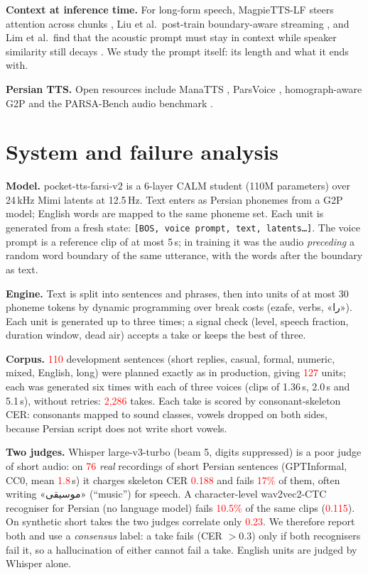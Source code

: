 \documentclass[conference]{IEEEtran}
\newcommand{\fa}[1]{{\persianfont\beginR #1\endR}}
\newcommand{\RES}[1]{\textcolor{red}{#1}}
\begin{document}
\textbf{Context at inference time.} For long-form speech, MagpieTTS-LF steers attention across chunks
\cite{magpielf2026}, Liu et al.\ post-train boundary-aware streaming \cite{liu2026boundary}, and Lim et al.\
find that the acoustic prompt must stay in context while speaker similarity still decays
\cite{lim2026longer}. We study the prompt itself: its length and what it ends with.

\textbf{Persian TTS.} Open resources include ManaTTS \cite{manatts2025}, ParsVoice \cite{parsvoice2026},
homograph-aware G2P \cite{homorich2025} and the PARSA-Bench audio benchmark \cite{parsabench2026}.

\section{System and failure analysis}\label{sec:system}
\textbf{Model.} pocket-tts-farsi-v2 \cite{farsiv2} is a 6-layer CALM student (110M parameters) over 24\,kHz
Mimi latents at 12.5\,Hz. Text enters as Persian phonemes from a G2P model; English words are mapped to the
same phoneme set. Each unit is generated from a fresh state: \texttt{[BOS, voice prompt, text, latents\dots]}.
The voice prompt is a reference clip of at most 5\,s; in training it was the audio \emph{preceding} a random
word boundary of the same utterance, with the words after the boundary as text.

\textbf{Engine.} Text is split into sentences and phrases, then into units of at most 30 phoneme tokens by
dynamic programming over break costs (ezafe, verbs, \fa{«را»}). Each unit is generated up to three times; a
signal check (level, speech fraction, duration window, dead air) accepts a take or keeps the best of three.

\textbf{Corpus.} \RES{110} development sentences (short replies, casual, formal, numeric, mixed, English, long)
were planned exactly as in production, giving \RES{127} units; each was generated six times with each of three voices
(clips of 1.36\,s, 2.0\,s and 5.1\,s), without retries: \RES{2{,}286} takes. Each take is scored by
consonant-skeleton CER: consonants mapped to sound classes, vowels dropped on both sides, because Persian
script does not write short vowels.

\textbf{Two judges.} Whisper large-v3-turbo \cite{whisper2023} (beam 5, digits suppressed) is a poor judge of
short audio: on \RES{76} \emph{real} recordings of short Persian sentences (GPTInformal, CC0, mean
\RES{1.8}\,s) it charges skeleton CER \RES{0.188} and fails \RES{17\%} of them, often writing \fa{«موسیقی»}
(``music'') for speech. A character-level wav2vec2-CTC recogniser for Persian (no language model) fails
\RES{10.5\%} of the same clips (\RES{0.115}). On synthetic short takes the two judges correlate only
\RES{0.23}. We therefore report both and use a \emph{consensus} label: a take fails (CER $>0.3$) only if both
recognisers fail it, so a hallucination of either cannot fail a take. English units are judged by Whisper
alone.
\end{document}
